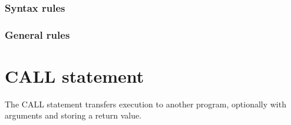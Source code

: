 \subsubsection{Syntax rules}

\subsubsection{General rules}

\section{CALL statement}

The CALL statement transfers execution to another program, optionally with arguments and storing a return value.

\begin{syntax}


  
  \begin{1=}
    \begin{1=}
      \identifier \\
      \literal \\
      \functionname
    \end{1=} \\

    \begin{0-1}
      \begin{1=}
        \identifier \\
        \literal \\
        \functionname
      \end{1=}
    \end{0-1}
    \begin{1=}
       \\
    \end{1=}
  \end{1=}
  


\end{syntax}
